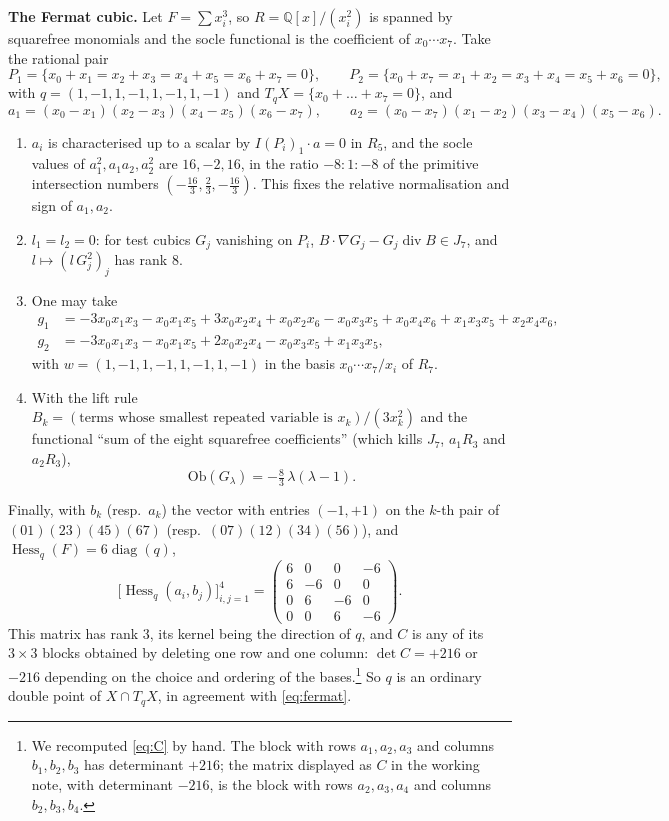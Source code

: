 \documentclass[10pt]{article}
\numberwithin{equation}{section}
\theoremstyle{remark}
\newcommand{\QQ}{\mathbb{Q}}
\newcommand{\Hess}{\operatorname{Hess}}
\newcommand{\dv}{\operatorname{div}}
\newcommand{\run}[1]{\medskip\noindent\textbf{#1}}
\begin{document}
\run{The Fermat cubic.} Let $F=\sum x_i^3$, so $R=\QQ[x]/(x_i^2)$ is spanned by squarefree
monomials and the socle functional is the coefficient of $x_0\cdots x_7$. Take the rational pair
\[
P_1=\{x_0+x_1=x_2+x_3=x_4+x_5=x_6+x_7=0\},\qquad P_2=\{x_0+x_7=x_1+x_2=x_3+x_4=x_5+x_6=0\},
\]
with $q=(1,-1,1,-1,1,-1,1,-1)$ and $T_qX=\{x_0+\dots+x_7=0\}$, and
\[
a_1=(x_0-x_1)(x_2-x_3)(x_4-x_5)(x_6-x_7),\qquad a_2=(x_0-x_7)(x_1-x_2)(x_3-x_4)(x_5-x_6).
\]
\begin{enumerate}[label=\textup{\arabic*.}]
\item $a_i$ is characterised up to a scalar by $I(P_i)_1\cdot a=0$ in $R_5$, and the socle values of
$a_1^2,a_1a_2,a_2^2$ are $16,-2,16$, in the ratio $-8:1:-8$ of the primitive intersection numbers
$(-\frac{16}3,\frac23,-\frac{16}3)$. This fixes the relative normalisation and sign of $a_1,a_2$.
\item $l_1=l_2=0$: for test cubics $G_j$ vanishing on $P_i$, $B\cdot\nabla G_j-G_j\dv B\in J_7$, and
$l\mapsto(l\,G_j^2)_j$ has rank $8$.
\item One may take
\begin{align*}
g_1&=-3x_0x_1x_3-x_0x_1x_5+3x_0x_2x_4+x_0x_2x_6-x_0x_3x_5+x_0x_4x_6+x_1x_3x_5+x_2x_4x_6,\\
g_2&=-3x_0x_1x_3-x_0x_1x_5+2x_0x_2x_4-x_0x_3x_5+x_1x_3x_5,
\end{align*}
with $w=(1,-1,1,-1,1,-1,1,-1)$ in the basis $x_0\cdots x_7/x_i$ of $R_7$.
\item With the lift rule $B_k=(\text{terms whose smallest repeated variable is }x_k)/(3x_k^2)$ and the functional
``sum of the eight squarefree coefficients'' (which kills $J_7$, $a_1R_3$ and $a_2R_3$),
\begin{equation}\label{eq:fermat}
\mathrm{Ob}(G_\lambda)=-\tfrac83\,\lambda(\lambda-1).
\end{equation}
\end{enumerate}
Finally, with $b_k$ (resp.\ $a_k$) the vector with entries $(-1,+1)$ on the $k$-th pair of $(01)(23)(45)(67)$
(resp.\ $(07)(12)(34)(56)$), and $\Hess_q(F)=6\operatorname{diag}(q)$,
\begin{equation}\label{eq:C}
\bigl[\Hess_q(a_i,b_j)\bigr]_{i,j=1}^4=\begin{pmatrix}6&0&0&-6\\6&-6&0&0\\0&6&-6&0\\0&0&6&-6\end{pmatrix}.
\end{equation}
This matrix has rank $3$, its kernel being the direction of $q$, and $C$ is any of its $3\times3$ blocks
obtained by deleting one row and one column: $\det C=+216$ or $-216$ depending on the choice and ordering of
the bases.\footnote{We recomputed \eqref{eq:C} by hand. The block with rows $a_1,a_2,a_3$ and columns
$b_1,b_2,b_3$ has determinant $+216$; the matrix displayed as $C$ in the working note, with determinant $-216$,
is the block with rows $a_2,a_3,a_4$ and columns $b_2,b_3,b_4$.} So $q$ is an ordinary double point of
$X\cap T_qX$, in agreement with \eqref{eq:fermat}.
\end{document}
